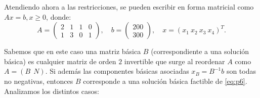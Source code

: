 \documentclass[11pt,a4paper]{article}
\begin{document}
Atendiendo ahora a las restricciones, se pueden escribir en forma matricial como $Ax=b, x\geq 0$, donde:
\[
A=\begin{pmatrix}
  2 & 1 & 1 & 0\\
  1 & 3 & 0 & 1
\end{pmatrix}, \quad b = \begin{pmatrix}
  200\\300
\end{pmatrix}, \quad x= (x_1 \ x_2 \ x_3 \ x_4)^T.
\]

Sabemos que en este caso una matriz básica $B$ (correspondiente a una solución básica) es cualquier matriz de orden $2$ invertible que surge al reordenar $A$ como $A=(B \ \ N)$. Si además las componentes básicas asociadas $x_B=B^{-1}b$ son todas no negativas, entonces $B$ corresponde a una solución básica factible de \eqref{eq:p6}. Analizamos los distintos casos:
\end{document}
